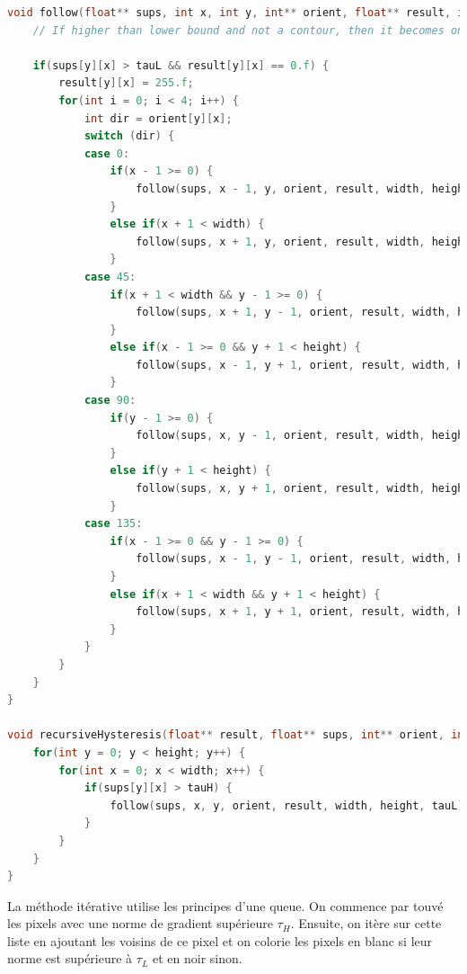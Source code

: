 \documentclass{article}
\begin{document}
\begin{lstlisting}[language=C]
void follow(float** sups, int x, int y, int** orient, float** result, int width, int height, float tauL) {
    // If higher than lower bound and not a contour, then it becomes one

    if(sups[y][x] > tauL && result[y][x] == 0.f) {
        result[y][x] = 255.f;
        for(int i = 0; i < 4; i++) {
            int dir = orient[y][x];
            switch (dir) {
            case 0:
                if(x - 1 >= 0) {
                    follow(sups, x - 1, y, orient, result, width, height, tauL);
                }
                else if(x + 1 < width) {
                    follow(sups, x + 1, y, orient, result, width, height, tauL);
                }
            case 45:
                if(x + 1 < width && y - 1 >= 0) {
                    follow(sups, x + 1, y - 1, orient, result, width, height, tauL);
                }
                else if(x - 1 >= 0 && y + 1 < height) {
                    follow(sups, x - 1, y + 1, orient, result, width, height, tauL);
                }
            case 90:
                if(y - 1 >= 0) {
                    follow(sups, x, y - 1, orient, result, width, height, tauL);
                }
                else if(y + 1 < height) {
                    follow(sups, x, y + 1, orient, result, width, height, tauL);
                }
            case 135:
                if(x - 1 >= 0 && y - 1 >= 0) {
                    follow(sups, x - 1, y - 1, orient, result, width, height, tauL);
                }
                else if(x + 1 < width && y + 1 < height) {
                    follow(sups, x + 1, y + 1, orient, result, width, height, tauL);
                }
            }
        }
    }
}

void recursiveHysteresis(float** result, float** sups, int** orient, int width, int height, float tauL, float tauH) {
    for(int y = 0; y < height; y++) {
        for(int x = 0; x < width; x++) {
            if(sups[y][x] > tauH) {
                follow(sups, x, y, orient, result, width, height, tauL);
            }
        }
    }
}
\end{lstlisting}
La méthode itérative utilise les principes d'une queue. On commence par touvé les pixels avec une norme de gradient supérieure $\tau_H$. Ensuite, on itère
sur cette liste en ajoutant les voisins de ce pixel et on colorie les pixels en blanc si leur norme est supérieure à $\tau_L$ et en noir sinon.
\end{document}
